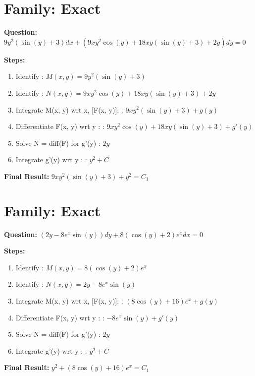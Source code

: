 \documentclass{article}
\begin{document}
\section*{Family: Exact}
\textbf{Question:} $9 y^{2} \left(\sin{\left(y \right)} + 3\right) dx + \left(9 x y^{2} \cos{\left(y \right)} + 18 x y \left(\sin{\left(y \right)} + 3\right) + 2 y\right) dy = 0$

\textbf{Steps:}
\begin{enumerate}
\item Identify :  $M(x, y) = 9 y^{2} \left(\sin{\left(y \right)} + 3\right)$
\item Identify :  $N(x, y) = 9 x y^{2} \cos{\left(y \right)} + 18 x y \left(\sin{\left(y \right)} + 3\right) + 2 y$
\item Integrate M(x, y) wrt x, [F(x, y)]: :  $9 x y^{2} \left(\sin{\left(y \right)} + 3\right) + g(y)$
\item Differentiate F(x, y) wrt y :  :  $9 x y^{2} \cos{\left(y \right)} + 18 x y \left(\sin{\left(y \right)} + 3\right) + g'(y)$
\item Solve N = diff(F) for g'(y) :  $2 y$
\item Integrate g'(y) wrt y :  :  $y^{2} + C$
\end{enumerate}
\textbf{Final Result:} $9 x y^{2} \left(\sin{\left(y \right)} + 3\right) + y^{2} = C_{1}$

\section*{Family: Exact}
\textbf{Question:} $\left(2 y - 8 e^{x} \sin{\left(y \right)}\right) dy + 8 \left(\cos{\left(y \right)} + 2\right) e^{x} dx = 0$

\textbf{Steps:}
\begin{enumerate}
\item Identify :  $M(x, y) = 8 \left(\cos{\left(y \right)} + 2\right) e^{x}$
\item Identify :  $N(x, y) = 2 y - 8 e^{x} \sin{\left(y \right)}$
\item Integrate M(x, y) wrt x, [F(x, y)]: :  $\left(8 \cos{\left(y \right)} + 16\right) e^{x} + g(y)$
\item Differentiate F(x, y) wrt y :  :  $- 8 e^{x} \sin{\left(y \right)} + g'(y)$
\item Solve N = diff(F) for g'(y) :  $2 y$
\item Integrate g'(y) wrt y :  :  $y^{2} + C$
\end{enumerate}
\textbf{Final Result:} $y^{2} + \left(8 \cos{\left(y \right)} + 16\right) e^{x} = C_{1}$
\end{document}
